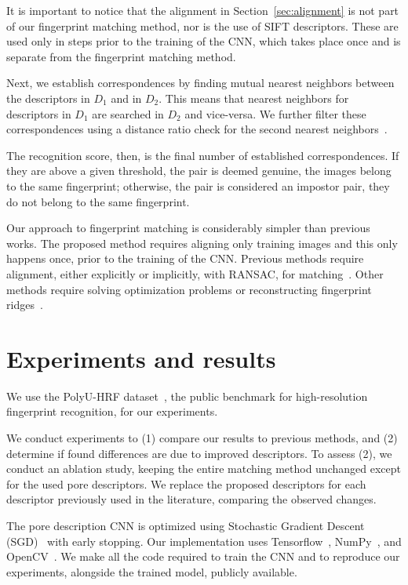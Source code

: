\documentclass[10pt,twocolumn,letterpaper]{article}
\begin{document}
It is important to notice that the alignment in Section~\ref{sec:alignment} is not part of our fingerprint matching method, nor is the use of SIFT descriptors.
These are used only in steps prior to the training of the CNN, which takes place once and is separate from the fingerprint matching method.

Next, we establish correspondences by finding mutual nearest neighbors between the descriptors in $D_1$ and in $D_2$.
This means that nearest neighbors for descriptors in $D_1$ are searched in $D_2$ and vice-versa.
We further filter these correspondences using a distance ratio check for the second nearest neighbors~\cite{sift}.

The recognition score, then, is the final number of established correspondences.
If they are above a given threshold, the pair is deemed genuine, \ie the images belong to the same fingerprint; otherwise, the pair is considered an impostor pair, \ie they do not belong to the same fingerprint.

Our approach to fingerprint matching is considerably simpler than previous works.
The proposed method requires aligning only training images and this only happens once, prior to the training of the CNN.
Previous methods require alignment, either explicitly or implicitly, \eg with RANSAC, for matching~\cite{direct-pore, td-sparse}.
Other methods require solving optimization problems or reconstructing fingerprint ridges~\cite{su-pores-deep, feature-guided, ridge-reconstruction}.

\section{Experiments and results}
\label{sec:exps}
We use the PolyU-HRF dataset~\cite{direct-pore}, the public benchmark for high-resolution fingerprint recognition, for our experiments.

We conduct experiments to (1) compare our results to previous methods, and (2) determine if found differences are due to improved descriptors.
To assess (2), we conduct an ablation study, keeping the entire matching method unchanged except for the used pore descriptors.
We replace the proposed descriptors for each descriptor previously used in the literature, comparing the observed changes.

The pore description CNN is optimized using Stochastic Gradient Descent (SGD)~\cite{sgd} with early stopping.
Our implementation uses Tensorflow~\cite{tf}, NumPy~\cite{np}, and OpenCV~\cite{opencv}.
We make all the code required to train the CNN and to reproduce our experiments, alongside the trained model, publicly available.
\end{document}
